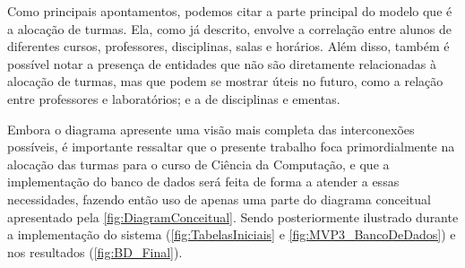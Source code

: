 Como principais apontamentos, podemos citar a parte principal do modelo que é a alocação de turmas. Ela, como já descrito, envolve a correlação entre alunos de diferentes cursos, professores, disciplinas, salas e horários. Além disso, também é possível notar a presença de entidades que não são diretamente relacionadas à alocação de turmas, mas que podem se mostrar úteis no futuro, como a relação entre professores e laboratórios; e a de disciplinas e ementas.

Embora o diagrama apresente uma visão mais completa das interconexões possíveis, é importante ressaltar que o presente trabalho foca primordialmente na alocação das turmas para o curso de Ciência da Computação, e que a implementação do banco de dados será feita de forma a atender a essas necessidades, fazendo então uso de apenas uma parte do diagrama conceitual apresentado pela \autoref{fig:DiagramConceitual}. Sendo posteriormente ilustrado durante a implementação do sistema (\autoref{fig:TabelasIniciais} e \autoref{fig:MVP3_BancoDeDados}) e nos resultados (\autoref{fig:BD_Final}).




